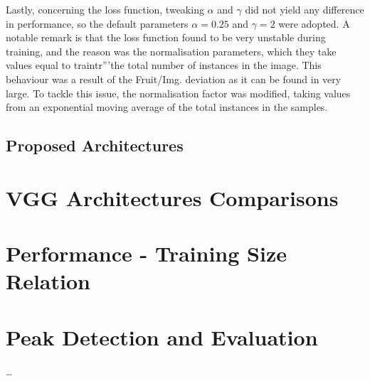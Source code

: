 Lastly, concerning the loss function, tweaking $\alpha$ and $\gamma$ did not yield any difference in performance, so the default parameters $\alpha=0.25$ and $\gamma=2$ were adopted. A notable remark is that the loss function found to be very unstable during training, and the reason was the normalisation parameters, which they take values equal to traintr'''the total number of instances in the image. This behaviour was a result of the Fruit/Img. deviation as it can be found in  very large. To tackle this issue, the normalisation factor was modified, taking values from an exponential moving average of the total instances in the samples.
 
\subsection{Proposed Architectures}

\section{VGG Architectures Comparisons}

\section{Performance - Training Size Relation}

\section{Peak Detection and Evaluation}

\dots